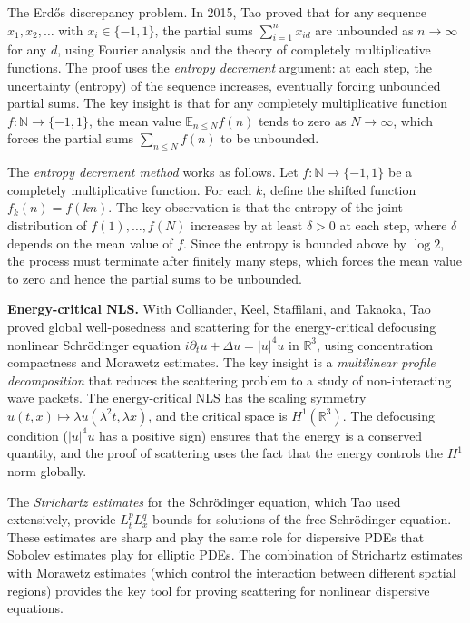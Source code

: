 The Erd\H{o}s discrepancy problem. In 2015, Tao proved that for any sequence $x_1, x_2, \ldots$ with $x_i \in \{-1, 1\}$, the partial sums $\sum_{i=1}^n x_{id}$ are unbounded as $n \to \infty$ for any $d$, using Fourier analysis and the theory of completely multiplicative functions. The proof uses the \emph{entropy decrement} argument: at each step, the uncertainty (entropy) of the sequence increases, eventually forcing unbounded partial sums. The key insight is that for any completely multiplicative function $f: \mathbb{N} \to \{-1, 1\}$, the mean value $\mathbb{E}_{n \le N} f(n)$ tends to zero as $N \to \infty$, which forces the partial sums $\sum_{n \le N} f(n)$ to be unbounded.

The \emph{entropy decrement method} works as follows. Let $f: \mathbb{N} \to \{-1, 1\}$ be a completely multiplicative function. For each $k$, define the shifted function $f_k(n) = f(kn)$. The key observation is that the entropy of the joint distribution of $f(1), \ldots, f(N)$ increases by at least $\delta > 0$ at each step, where $\delta$ depends on the mean value of $f$. Since the entropy is bounded above by $\log 2$, the process must terminate after finitely many steps, which forces the mean value to zero and hence the partial sums to be unbounded.

\textbf{Energy-critical NLS.} With Colliander, Keel, Staffilani, and Takaoka, Tao proved global well-posedness and scattering for the energy-critical defocusing nonlinear Schr\"odinger equation $i\partial_t u + \Delta u = |u|^4 u$ in $\mathbb{R}^3$, using concentration compactness and Morawetz estimates. The key insight is a \emph{multilinear profile decomposition} that reduces the scattering problem to a study of non-interacting wave packets. The energy-critical NLS has the scaling symmetry $u(t,x) \mapsto \lambda u(\lambda^2 t, \lambda x)$, and the critical space is $H^1(\mathbb{R}^3)$. The defocusing condition ($|u|^4 u$ has a positive sign) ensures that the energy is a conserved quantity, and the proof of scattering uses the fact that the energy controls the $H^1$ norm globally.

The \emph{Strichartz estimates} for the Schr\"odinger equation, which Tao used extensively, provide $L^p_t L^q_x$ bounds for solutions of the free Schr\"odinger equation. These estimates are sharp and play the same role for dispersive PDEs that Sobolev estimates play for elliptic PDEs. The combination of Strichartz estimates with Morawetz estimates (which control the interaction between different spatial regions) provides the key tool for proving scattering for nonlinear dispersive equations.

